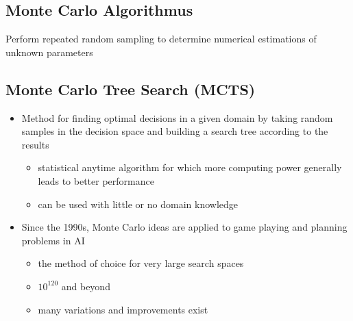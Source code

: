 \documentclass[conference, a4paper]{styles/acmsiggraph}
\begin{document}
    
    \subsection{Monte Carlo Algorithmus}
        Perform repeated random sampling to determine numerical estimations of unknown parameters
    
    \subsection{Monte Carlo Tree Search (MCTS)}
        \begin{itemize}
            \item Method for finding optimal decisions in a given domain by taking random samples in the decision space and building a search tree according to the results
                \begin{itemize}
                    \item statistical anytime algorithm for which more computing power generally leads to better performance
                    \item can be used with little or no domain knowledge
                \end{itemize}
            \item Since the 1990s, Monte Carlo ideas are applied to game playing and planning problems in AI
                \begin{itemize}
                    \item the method of choice for very large search spaces
                    \item $10^{120}$ and beyond
                    \item many variations and improvements exist
                \end{itemize}
        \end{itemize}
\end{document}
